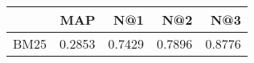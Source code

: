 \begin{tabular}{lrrrr}
\toprule
{} &     MAP &     N@1 &     N@2 &     N@3 \\
\midrule
BM25 &  0.2853 &  0.7429 &  0.7896 &  0.8776 \\
\bottomrule
\end{tabular}
